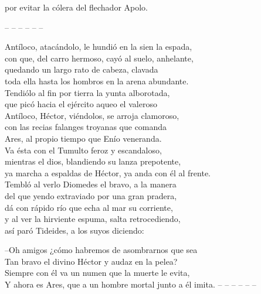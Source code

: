 \documentclass[11pt,twoside]{article}
\begin{document}
por evitar la cólera del flechador Apolo.\par
\pend
%
\noindent-- -- -- -- -- --\par
%
\pstart
{}Antíloco, atacándolo, le hundió en la sien la espada,\\
con que, del carro hermoso, cayó al suelo, anhelante,\\
quedando un largo rato de cabeza, clavada\\
toda ella hasta los hombros en la arena abundante.\\
Tendiólo al fin por tierra la yunta alborotada,\\
que picó hacia el ejército aqueo el valeroso\\
Antíloco, Héctor, viéndolos, se arroja clamoroso,\\
con las recias falanges troyanas que comanda\\
Ares, al propio tiempo que Enío veneranda.\\
Va ésta con el Tumulto feroz y escandaloso,\\
mientras el dios, blandiendo su lanza prepotente,\\
ya marcha a espaldas de Héctor, ya anda con él al frente.\\
Tembló al verlo Diomedes el bravo, a la manera\\
del que yendo extraviado por una gran pradera,\\
dá con rápido río que echa al mar su corriente,\\
y al ver la hirviente espuma, salta retrocediendo,\\
así paró Tideides, a los suyos diciendo:\par
--Oh amigos ¿cómo habremos de asombrarnos que sea\\
Tan bravo el divino Héctor y audaz en la pelea?\\
Siempre con él va un numen que la muerte le evita,\\
Y ahora es Ares, que a un hombre mortal junto a él imita.
\pend
%
\noindent-- -- -- -- -- --\par
%
\endnumbering
\newpage
%
%
\end{document}
